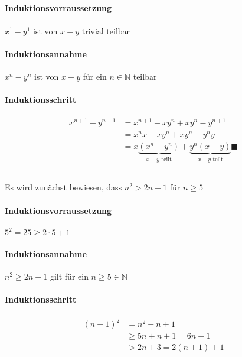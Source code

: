 \documentclass{article}
\begin{document}
        \subsection{}
            \paragraph{Induktionsvorraussetzung}
                $x^1-y^1$ ist von $x-y$ trivial teilbar
            \paragraph{Induktionsannahme}
                $x^n-y^n$ ist von $x-y$ für ein $n\in\mathbb N$ teilbar
            \paragraph{Induktionsschritt}
                \begin{align*}
                    x^{n+1}-y^{n+1} &= x^{n+1} -xy^n+xy^n -y^{n+1}\\
                    &= x^n x-xy^n+xy^n-y^ny\\
                    &=x\underbrace{(x^n-y^n)}_{x-y\text{ teilt}}+
                    \underbrace{y^n(x-y)}_{x-y\text{ teilt}}\blacksquare
                \end{align*}
        \subsection{}
            Es wird zunächst bewiesen, dass $n^2>2n+1$ für $n \geq 5$
            \paragraph{Induktionsvorraussetzung}
                $5^2=25 \geq 2\cdot 5+1$
            \paragraph{Induktionsannahme}
                $n^2\geq 2n+1$ gilt für ein $n\geq 5 \in \mathbb N$
            \paragraph{Induktionsschritt}
                \begin{align*}
                    (n+1)^2&=n^2+n+1\\
                    &\geq 5n+n+1=6n+1\\
                    &> 2n+3 = 2(n+1)+1
                \end{align*}
\end{document}
